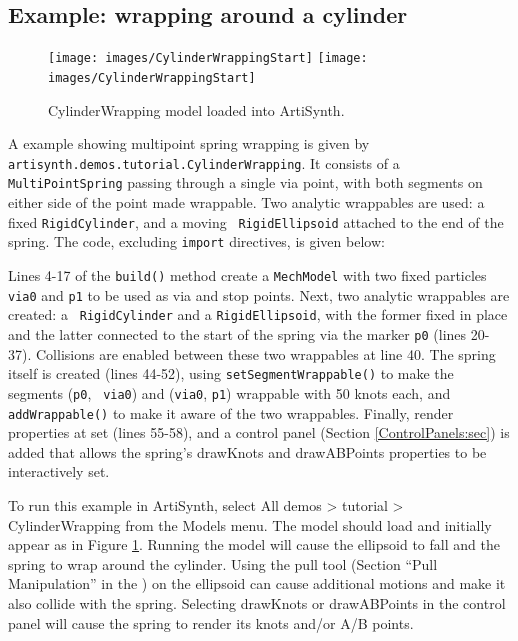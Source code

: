 \subsection{Example: wrapping around a cylinder}
\label{CylinderWrapping:sec}

\begin{figure}[t]
\begin{center}
\iflatexml
 \texttt{[image: images/CylinderWrappingStart]}
\else
 \texttt{[image: images/CylinderWrappingStart]}
\fi
\end{center}
\caption{CylinderWrapping model loaded into ArtiSynth.}
\label{CylinderWrapping:fig}
\end{figure}

A example showing multipoint spring wrapping is given by {\tt
artisynth.demos.tutorial.CylinderWrapping}.  It consists of a
{\tt MultiPointSpring} passing through a single via point, with both
segments on either side of the point made wrappable. Two analytic
wrappables are used: a fixed {\tt RigidCylinder}, and a moving {\tt
RigidEllipsoid} attached to the end of the spring. The code, excluding
{\tt import} directives, is given below: 

\lstset{numbers=left} 
\iflatexml

\else

\fi
\lstset{numbers=none}

Lines 4-17 of the {\tt build()} method create a {\tt MechModel} with
two fixed particles {\tt via0} and {\tt p1} to be used as via and stop
points. Next, two analytic wrappables are created: a {\tt
RigidCylinder} and a {\tt RigidEllipsoid}, with the former fixed in
place and the latter connected to the start of the spring via the
marker {\tt p0} (lines 20-37). Collisions are enabled between these
two wrappables at line 40. The spring itself is created (lines 44-52),
using {\tt setSegmentWrappable()} to make the segments ({\tt p0}, {\tt
via0}) and ({\tt via0}, {\tt p1}) wrappable with 50 knots each, and
{\tt addWrappable()} to make it aware of the two wrappables.  Finally,
render properties at set (lines 55-58), and a control panel (Section
\ref{ControlPanels:sec}) is added that allows the spring's {\sf
drawKnots} and {\sf drawABPoints} properties to be interactively set.

To run this example in ArtiSynth, select {\sf All demos > tutorial >
CylinderWrapping} from the {\sf Models} menu. The model should load and
initially appear as in Figure \ref{CylinderWrapping:fig}.  Running the
model will cause the ellipsoid to fall and the spring to wrap around
the cylinder. Using the pull tool
(Section ``Pull Manipulation'' in the
)
on the ellipsoid can cause additional motions and make it also collide
with the spring. Selecting {\sf drawKnots} or {\sf drawABPoints} in
the control panel will cause the spring to render its knots and/or A/B
points.

